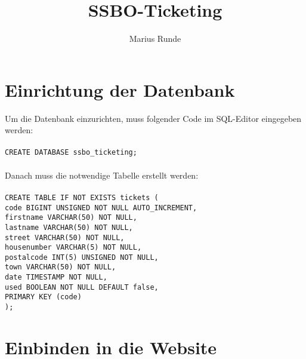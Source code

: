 \documentclass[12pt,a4paper,final,twoside,onecolumn,titlepage]{article}
\author{Marius Runde}
\title{SSBO-Ticketing}
\begin{document}
\maketitle
\tableofcontents

\section{Einrichtung der Datenbank}

Um die Datenbank einzurichten, muss folgender Code im SQL-Editor eingegeben werden:\\\\
\texttt{\hspace*{10mm}CREATE DATABASE ssbo\_ticketing;}\\\\
Danach muss die notwendige Tabelle erstellt werden:\\\\
\texttt{\hspace*{10mm}CREATE TABLE IF NOT EXISTS tickets (\\
	\hspace*{20mm}code		BIGINT UNSIGNED NOT NULL AUTO\_INCREMENT,\\
	\hspace*{20mm}firstname	VARCHAR(50) NOT NULL,\\
	\hspace*{20mm}lastname	VARCHAR(50) NOT NULL,\\
	\hspace*{20mm}street		VARCHAR(50) NOT NULL,\\
	\hspace*{20mm}housenumber	VARCHAR(5) NOT NULL,\\
	\hspace*{20mm}postalcode	INT(5) UNSIGNED NOT NULL,\\
	\hspace*{20mm}town		VARCHAR(50) NOT NULL,\\
	\hspace*{20mm}date		TIMESTAMP NOT NULL,\\
	\hspace*{20mm}used		BOOLEAN NOT NULL DEFAULT false,\\
	\hspace*{20mm}PRIMARY KEY (code)\\
\hspace*{10mm});}

\section{Einbinden in die Website}
\end{document}
